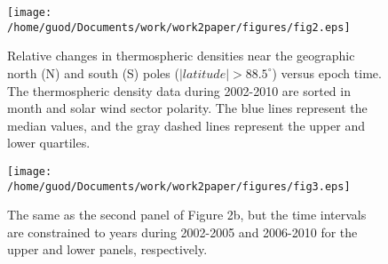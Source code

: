 \documentclass[draft, grl]{/home/guod/Documents/template/agu_template/AGUTeX}
\begin{document}
\begin{figure}
    \centering
    \noindent\texttt{[image: /home/guod/Documents/work/work2paper/figures/fig2.eps]}
    \caption{Relative changes in thermospheric densities near the geographic 
        north (N) and south (S) poles ($\left|latitude\right| > 88.5^\circ$)
        versus epoch time. The thermospheric density data during 2002-2010 are
        sorted in month and solar wind sector polarity. The blue lines 
        represent the median values, and the gray dashed lines represent the
        upper and lower quartiles.}
    \label{figure2}
\end{figure}
\begin{figure}
    \centering
    \noindent\texttt{[image: /home/guod/Documents/work/work2paper/figures/fig3.eps]}
    \caption{The same as the second panel of Figure 2b, but the time intervals 
        are constrained to years during 2002-2005 and 2006-2010 for the upper 
        and lower panels, respectively.}
    \label{figure3}
\end{figure}
\end{document}
